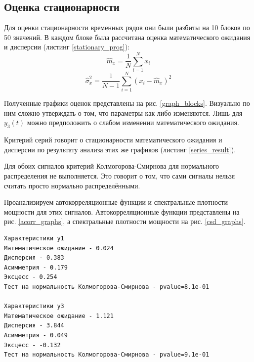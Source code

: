 \subsection{Оценка стационарности}

Для оценки стационарности временных рядов они были разбиты на 10 блоков по 50 значений. В каждом блоке была рассчитана оценка математического ожидания и дисперсии (листинг \ref{stationary_prog}):
\begin{equation}
	\hat{m}_x = \frac{1}{N} \sum_{i=1}^N x_i
\end{equation}
\begin{equation}
	\hat{\sigma}_x^2 = \frac{1}{N-1} \sum_{i=1}^N (x_i - \hat{m}_x)^2 
\end{equation}

Полученные графики оценок представлены на рис. \ref{graph_blocks}. Визуально по ним сложно утверждать о том, что параметры как либо изменяются. Лишь для $y_3(t)$ можно предположить о слабом изменении математического ожидания. 

Критерий серий говорит о стационарности математического ожидания и дисперсии по результату анализа этих же графиков (листинг \ref{series_result}). 

Для обоих сигналов критерий Колмогорова-Смирнова для нормального распределения не выполняется. Это говорит о том, что сами сигналы нельзя считать просто нормально распределёнными.

Проанализируем автокорреляционные функции и спектральные плотности мощности для этих сигналов. Автокорреляционные функции представлены на рис. \ref{acorr_graphs}, а спектральные плотности мощности на рис. \ref{csd_graphs}.

{
	\vspace{-1.5em}
	\label{series_result}
	\begin{verbatim}
Характеристики y1
Математическое ожидание - 0.024
Дисперсия - 0.383
Асимметрия - 0.179
Эксцесс - 0.254
Тест на нормальность Колмогорова-Смирнова - pvalue=8.1e-01

Характеристики y3
Математическое ожидание - 1.121
Дисперсия - 3.844
Асимметрия - 0.049
Эксцесс - -0.132
Тест на нормальность Колмогорова-Смирнова - pvalue=9.1e-01
	\end{verbatim}
}

